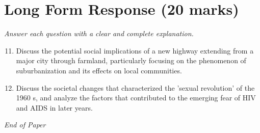 \documentclass[12pt]{article}
\begin{document}
\section*{Long Form Response (20 marks)}
\textit{Answer each question with a clear and complete explanation.}
\begin{enumerate}[label=\arabic*.]
\setcounter{enumi}{10}
\item Discuss the potential social implications of a new highway extending from a major city through farmland, particularly focusing on the phenomenon of suburbanization and its effects on local communities.
\item Discuss the societal changes that characterized the 'sexual revolution' of the 1960 s, and analyze the factors that contributed to the emerging fear of HIV and AIDS in later years.
\end{enumerate}

\vfill
\noindent\textit{End of Paper}
\end{document}
